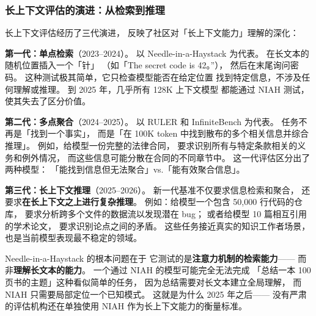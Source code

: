 \subsubsection{长上下文评估的演进：从检索到推理}

长上下文评估经历了三代演进，
反映了社区对「长上下文能力」理解的深化：

\textbf{第一代：单点检索}（2023--2024）。
以 Needle-in-a-Haystack 为代表。
在长文本的随机位置插入一个「针」
（如「The secret code is 42。”），
然后在末尾询问密码。
这种测试极其简单，它只检查模型能否在给定位置
找到特定信息，不涉及任何理解或推理。
到 2025 年，几乎所有 128K 上下文模型
都能通过 NIAH 测试，使其失去了区分价值。

\textbf{第二代：多点聚合}（2024--2025）。
以 RULER 和 InfiniteBench 为代表。
任务不再是「找到一个事实」，
而是「在 100K token 中找到散布的多个相关信息并综合推理」。
例如，给模型一份完整的法律合同，
要求识别所有与特定条款相关的义务和例外情况，
而这些信息可能分散在合同的不同章节中。
这一代评估区分出了两种模型：
「能找到信息但无法聚合」vs.「能有效聚合信息」。

\textbf{第三代：长上下文推理}（2025--2026）。
新一代基准不仅要求信息检索和聚合，
还要求\textbf{在长上下文之上进行复杂推理}。
例如：给模型一个包含 50,000 行代码的仓库，
要求分析跨多个文件的数据流以发现潜在 bug；
或者给模型 10 篇相互引用的学术论文，
要求识别论点之间的矛盾。
这些任务接近真实的知识工作者场景，
也是当前模型表现最不稳定的领域。

\begin{whybox}
Needle-in-a-Haystack 的根本问题在于
它测试的是\textbf{注意力机制的检索能力}——
而非\textbf{理解长文本的能力}。
一个通过 NIAH 的模型可能完全无法完成
「总结一本 100 页书的主题」这种看似简单的任务，
因为总结需要对长文本建立全局理解，
而 NIAH 只需要局部定位一个已知模式。
这就是为什么 2025 年之后——
没有严肃的评估机构还在单独使用 NIAH
作为长上下文能力的衡量标准。
\end{whybox}

